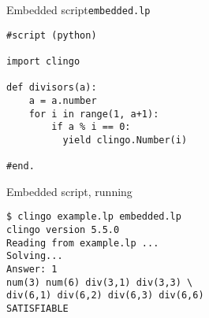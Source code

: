 \begin{frame}[fragile]{Embedded script}{\texttt{embedded.lp}}
  \bigskip
\begin{lstlisting}
#script (python)

import clingo

def divisors(a):
    a = a.number
    for i in range(1, a+1):
        if a % i == 0:
          yield clingo.Number(i)

#end.
\end{lstlisting}
\end{frame}
\begin{frame}[fragile]{Embedded script, running}
  \bigskip
\begin{lstlisting}
$ clingo example.lp embedded.lp
clingo version 5.5.0
Reading from example.lp ...
Solving...
Answer: 1
num(3) num(6) div(3,1) div(3,3) \
div(6,1) div(6,2) div(6,3) div(6,6)
SATISFIABLE
\end{lstlisting}
\end{frame}
%
